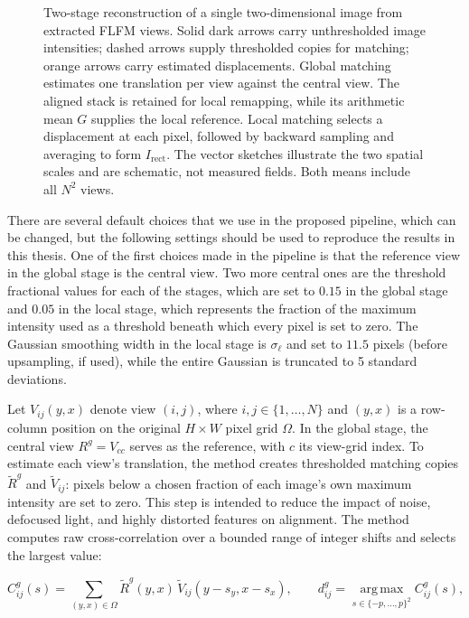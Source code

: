 \begin{figure}[tbp]
    \centering
    \resizebox{\textwidth}{!}{}
    \caption[Two-stage reconstruction: global alignment and local refinement.]{Two-stage reconstruction of a single two-dimensional image from extracted FLFM views. Solid dark arrows carry unthresholded image intensities; dashed arrows supply thresholded copies for matching; orange arrows carry estimated displacements. Global matching estimates one translation per view against the central view. The aligned stack is retained for local remapping, while its arithmetic mean $G$ supplies the local reference. Local matching selects a displacement at each pixel, followed by backward sampling and averaging to form $I_{\mathrm{rect}}$. The vector sketches illustrate the two spatial scales and are schematic, not measured fields. Both means include all $N^2$ views.}
    \label{fig:reconstruction-sequence}
\end{figure}

There are several default choices that we use in the proposed pipeline, which can be changed, but the following settings should be used to reproduce the results in this thesis. One of the first choices made in the pipeline is that the reference view in the global stage is the central view. Two more central ones are the threshold fractional values for each of the stages, which are set to $0.15$ in the global stage and $0.05$ in the local stage, which represents the fraction of the maximum intensity used as a threshold beneath which every pixel is set to zero. The Gaussian smoothing width in the local stage is $\sigma_\ell$ and set to $11.5$ pixels (before upsampling, if used), while the entire Gaussian is truncated to 5 standard deviations.

Let $V_{ij}(y,x)$ denote view $(i,j)$, where $i,j\in\{1,\ldots,N\}$ and $(y,x)$ is a row-column position on the original $H\times W$ pixel grid $\Omega$. In the global stage, the central view $R^g=V_{cc}$ serves as the reference, with $c$ its view-grid index.
To estimate each view's translation, the method creates thresholded matching copies $\widetilde R^g$ and $\widetilde V_{ij}$: pixels below a chosen fraction of each image's own maximum intensity are set to zero.
This step is intended to reduce the impact of noise, defocused light, and highly distorted features on alignment.
The method computes raw cross-correlation over a bounded range of integer shifts and selects the largest value:

\begin{equation}
    C^g_{ij}(s)=\sum_{(y,x)\in\Omega}\widetilde R^g(y,x)\,\widetilde V_{ij}(y-s_y,x-s_x),
    \qquad d^g_{ij}=\operatorname*{arg\,max}_{s\in\{-p,\ldots,p\}^2} C^g_{ij}(s),
\end{equation}

